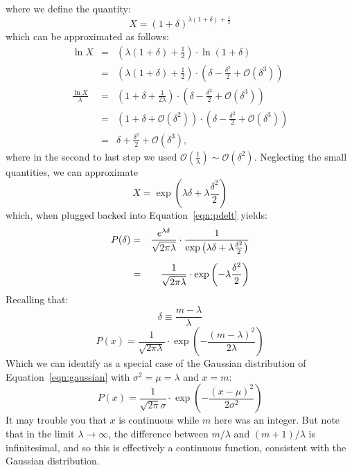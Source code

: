\documentclass[12pt,oneside]{book}
\begin{document}
where we define the quantity:
\begin{displaymath}
X = (1+\delta)^{\lambda(1+\delta)+\frac{1}{2}}
\end{displaymath}
which can be approximated as follows:
\begin{eqnarray*}
\ln X &=& \left( \lambda (1+\delta) + \frac{1}{2} \right) \cdot \ln(1+\delta) \\[5pt]
&=& \left( \lambda (1+\delta) + \frac{1}{2} \right) \cdot \left( \delta - \frac{\delta^2}{2} + \mathcal{O}(\delta^3)\right) \\[5pt]
\frac{\ln X}{\lambda}&=& \left( 1+\delta + \frac{1}{2\lambda} \right) \cdot \left( \delta - \frac{\delta^2}{2} + \mathcal{O}(\delta^3)\right) \\[5pt]
&=& \left( 1+\delta + \mathcal{O}\left(\delta^2\right) \right) \cdot \left( \delta - \frac{\delta^2}{2} + \mathcal{O}(\delta^3)\right) \\[5pt]
&=& \delta + \frac{\delta^2}{2}+ \mathcal{O}(\delta^3),
\end{eqnarray*}
where in the second to last step we used $\mathcal{O}\left(\frac{1}{\lambda}\right) \sim \mathcal{O}\left(\delta^2\right)$.  Neglecting the small quantities, we can approximate
\begin{displaymath}
X = \exp\left( \lambda\delta + \lambda\frac{\delta^2}{2} \right) 
\end{displaymath}
which, when plugged backed into Equation~\ref{eqn:pdelt} yields:
\begin{eqnarray}
\label{eqn:almost}
P(\delta) &=& \frac{e^{\lambda\delta}}{\sqrt{2\pi\lambda}} \cdot \frac{1}{\exp\left( \lambda\delta + \lambda\frac{\delta^2}{2} \right)} \notag \\[5pt]
&=& \frac{1}{\sqrt{2\pi\lambda}} \cdot \exp\left( -\lambda \frac{\delta^2}{2}\right)
\end{eqnarray}
Recalling that:
\begin{displaymath}
\delta \equiv \frac{m - \lambda}{\lambda} 
\end{displaymath}
\begin{equation}
P(x) = \frac{1}{\sqrt{2\pi \lambda}} \cdot \exp\left( - \frac{(m - \lambda)^2}{2 \lambda}\right)
\end{equation}
Which we can identify as a special case of the Gaussian distribution of Equation~\ref{eqn:gaussian} with 
$\sigma^2 = \mu = \lambda$ and $x = m$:
\begin{equation*}
P(x) = \frac{1}{\sqrt{2\pi} \sigma} \cdot \exp\left( - \frac{(x - \mu)^2}{2 \sigma^2}\right)
\end{equation*}
It may trouble you that $x$ is continuous while $m$ here was an integer.  But note that in the limit 
$\lambda \to \infty$, the difference between $m/\lambda$ and $(m+1)/\lambda$ is infinitesimal, and so this is effectively a continuous function, consistent with the Gaussian distribution.
\end{document}
